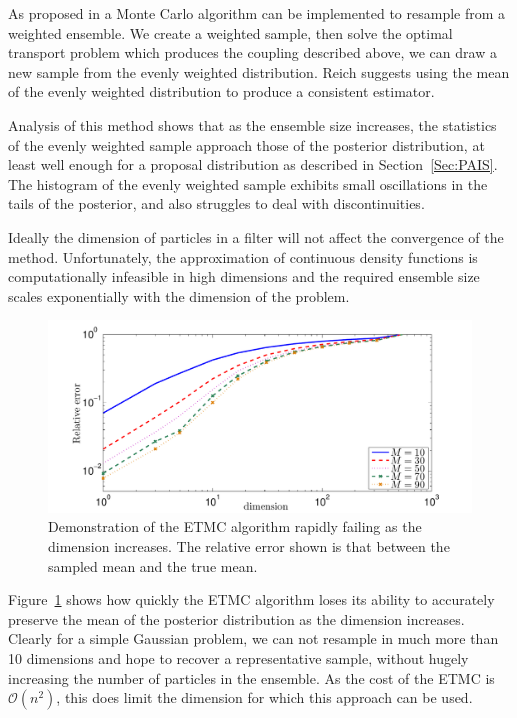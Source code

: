 \documentclass[final]{siamltex}
\begin{document}
As proposed in \cite{reich2013nonparametric} a Monte Carlo algorithm can be implemented to resample from a weighted ensemble. We create a weighted sample, then solve the optimal transport problem which produces the coupling described above, we can draw a new sample from the evenly weighted distribution. Reich suggests using the mean of the evenly weighted distribution to produce a consistent estimator.

Analysis of this method shows that as the ensemble size increases, the statistics of the evenly weighted sample approach those of the posterior distribution, at least well enough for a proposal distribution as described in Section~\ref{Sec:PAIS}. The histogram of the evenly weighted sample exhibits small oscillations in the tails of the posterior, and also struggles to deal with discontinuities.

Ideally the dimension of particles in a filter will not affect the convergence of the method. Unfortunately, the approximation of continuous density functions is computationally infeasible in high dimensions and the required ensemble size scales exponentially with the dimension of the problem\cite{silverman1986density,snyder2008obstacles}.

\begin{figure}[htb]
\begin{center}
\includegraphics[width=\textwidth]{figures/ET_dim_scaling}
\caption{Demonstration of the ETMC algorithm rapidly failing as the dimension increases. The relative error shown is that between the sampled mean and the true mean.}
\label{fig:ET_dim_scaling}
\end{center}
\end{figure}

Figure~\ref{fig:ET_dim_scaling} shows how quickly the ETMC algorithm
loses its ability to accurately preserve the mean of the posterior
distribution as the dimension increases. Clearly for a simple Gaussian
problem, we can not resample in much more than 10 dimensions and hope
to recover a representative sample, without hugely increasing the
number of particles in the ensemble. As the cost of the ETMC is
$\mathcal{O}(n^2)$, this does limit the dimension for which this
approach can be used.
\end{document}

